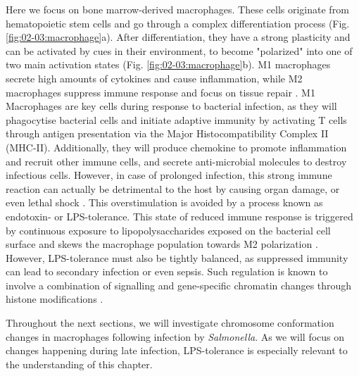 Here we focus on bone marrow-derived macrophages. These cells originate from hematopoietic stem cells and go through a complex differentiation process (Fig. \ref{fig:02-03:macrophage}a). After differentiation, they have a strong plasticity and can be activated by cues in their environment, to become "polarized" into one of two main activation states (Fig. \ref{fig:02-03:macrophage}b). M1 macrophages secrete high amounts of cytokines and cause inflammation, while M2 macrophages suppress immune response and focus on tissue repair \cite{ahmedM1M2Macrophages2020}. M1 Macrophages are key cells during response to bacterial infection, as they will phagocytise bacterial cells and initiate adaptive immunity by activating T cells through antigen presentation via the Major Histocompatibility Complex II (MHC-II). Additionally, they will produce chemokine to promote inflammation and recruit other immune cells, and secrete anti-microbial molecules to destroy infectious cells. However, in case of prolonged infection, this strong immune reaction can actually be detrimental to the host by causing organ damage, or even lethal shock \cite{magesGenomewideAnalysisLPS2008}. This overstimulation is avoided by a process known as endotoxin- or LPS-tolerance. This state of reduced immune response is triggered by continuous exposure to lipopolysaccharides exposed on the bacterial cell surface and skews the macrophage population towards M2 polarization \cite{portaToleranceM2Alternative2009}. However, LPS-tolerance must also be tightly balanced, as suppressed immunity can lead to secondary infection or even sepsis. Such regulation is known to involve a combination of signalling and gene-specific chromatin changes through histone modifications \cite{aungLPSRegulatesProinflammatory2006}.

 Throughout the next sections, we will investigate chromosome conformation changes in macrophages following infection by \textit{Salmonella}. As we will focus on changes happening during late infection, LPS-tolerance is especially relevant to the understanding of this chapter.

